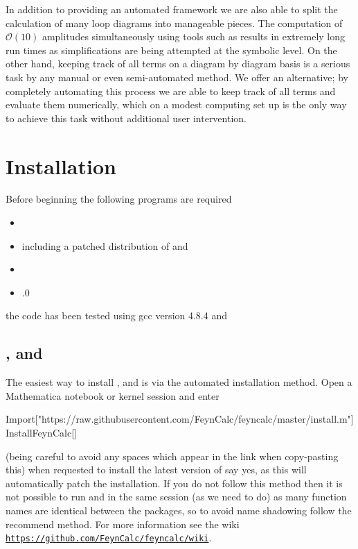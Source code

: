 In addition to providing an automated framework we are also able to split the calculation of many loop diagrams into manageable pieces.  The computation of $\mathcal{O}(10)$ amplitudes simultaneously using tools such as \feyncalc results in extremely long run times as simplifications are being attempted at the symbolic level.  On the other hand, keeping track of all terms on a diagram by diagram basis is a serious task by any manual or even semi-automated method.  We offer an alternative; by completely automating this process we are able to keep track of all terms and evaluate them numerically, which on a modest computing set up is the only way to achieve this task without additional user intervention.


\section{Installation}

Before beginning the following programs are required
\begin{itemize}
\item {}
\item {} including a patched distribution of  and 
\item {}
\item {}.0
\end{itemize}
the \mb \CC code has been tested using gcc version 4.8.4 and 

\subsection{\feyncalc, \feynarts and \tarcer}

The easiest way to install \feyncalc, \feynarts and \tarcer is via the automated installation method.  Open a Mathematica notebook or kernel session and enter
\begin{lstterm}
Import["https://raw.githubusercontent.com/FeynCalc/feyncalc/master/install.m"]
InstallFeynCalc[]
\end{lstterm}
(being careful to avoid any spaces which appear in the link when copy-pasting this) when requested to install the latest version of \feynarts say yes, as this will automatically patch the \feynarts installation.  If you do not follow this method then it is not possible to run \feynarts and \feyncalc in the same session (as we need to do) as many function names are identical between the packages, so to avoid name shadowing follow the recommend method.  For more information see the \feyncalc wiki \href{https://github.com/FeynCalc/feyncalc/wiki}{\lstinline{https://github.com/FeynCalc/feyncalc/wiki}}.

